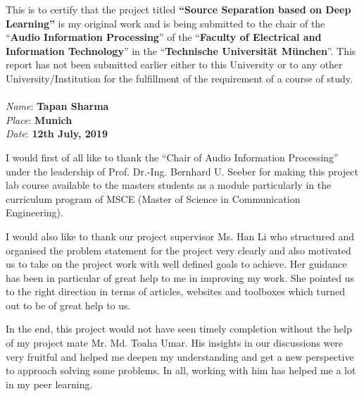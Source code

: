 \documentclass[
11pt, 
english, 
singlespacing, %
table, %
openany, %
headsepline, %
]{ProjectReport} %
\begin{document}
\begin{originality}
\addchaptertocentry{\originalityname}
This is to certify that the project titled \textbf{“Source Separation based on Deep Learning”} is my original work and is being submitted to the chair of the \enquote{\textbf{Audio Information Processing}} of the \enquote{\textbf{Faculty of Electrical and Information Technology}} in the \enquote{\textbf{Technische Universität München}}. This report has not been submitted earlier either to this University or to any other University/Institution for the fulfillment of the requirement of a course of study.\\
\\
\textit{Name}: \textbf{Tapan Sharma}\\
\textit{Place}: \textbf{Munich}\\
\textit{Date}: \textbf{12th July, 2019}\\
\end{originality} 


\begin{acknowledgements}
\addchaptertocentry{\acknowledgementname} %
I would first of all like to thank the \enquote{Chair of Audio Information Processing} under the leadership of Prof. Dr.-Ing. Bernhard U. Seeber for making this project lab course available to the masters students as a module particularly in the curriculum program of MSCE (Master of Science in Communication Engineering).\par
I would also like to thank our project supervisor Ms. Han Li who structured and organised the problem statement for the project very clearly and also motivated us to take on the project work with well defined goals to achieve. Her guidance has been in particular of great help to me in improving my work. She pointed us to the right direction in terms of articles, websites and toolboxes which turned out to be of great help to us.\par
In the end, this project would not have seen timely completion without the help of my project mate Mr. Md. Toaha Umar. His insights in our discussions were very fruitful and helped me deepen my understanding and get a new perspective to approach solving some problems. In all, working with him has helped me a lot in my peer learning. 
\end{acknowledgements}
\end{document}
